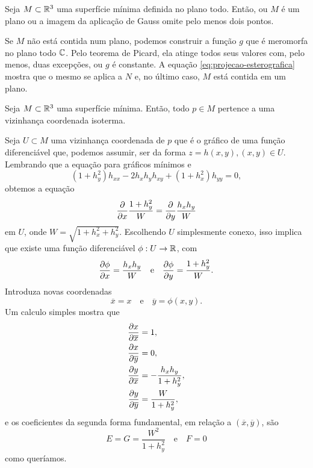 \begin{corolario}
	Seja $M \subset \mathbb{R}^3$ uma superfície mínima definida no plano todo. Então, ou $M$ é um plano ou a imagem da aplicação de Gauss omite pelo menos dois pontos.
\end{corolario}

\begin{demonstracao}
	Se $M$ não está contida num plano, podemos construir a função $g$ que é meromorfa no plano todo $\mathbb{C}$. Pelo teorema de Picard, ela atinge todos seus valores com, pelo menos, duas excepções, ou $g$ é constante. A equação \eqref{eq:projecao-esterografica} mostra que o mesmo se aplica a $N$ e, no último caso, $M$ está contida em um plano.
\end{demonstracao}

\begin{teorema}
	Seja $M \subset \mathbb{R}^3$ uma superfície mínima. Então, todo $p \in M$ pertence a uma vizinhança coordenada isoterma.
\end{teorema}

\begin{demonstracao}
	Seja $U \subset M$ uma vizinhança coordenada de $p$ que é o gráfico de uma função diferenciável que, podemos assumir, ser da forma $z = h(x,y), (x,y) \in U$.
	Lembrando que a equação para gráficos mínimos e
	\begin{equation*}
	(1 + h_y^2) h_{xx} - 2 h_x h_y h_{xy} + (1 + h_x^2) h_{yy} = 0,
	\end{equation*}
	obtemos a equação
	\begin{equation*}
	\frac{\partial}{\partial x} \frac{1 + h_y^2}{W} = \frac{\partial}{\partial y} \frac{h_x h_y}{W}
	\end{equation*}
	em $U$, onde $W = \sqrt{1 + h_x^2 + h_y^2}$. Escolhendo $U$ simplesmente conexo, isso implica que existe uma função diferenciável $\phi: U \rightarrow \mathbb{R}$, com
	\begin{equation*}
	\frac{\partial \phi}{\partial x} = \frac{h_x h_y}{W} \quad \text{e} \quad
	\frac{\partial \phi}{\partial y} = \frac{1 + h_y^2}{W}.
	\end{equation*}
	Introduza novas coordenadas
	\begin{equation*}
	\overline{x} = x \quad \text{e} \quad
	\overline{y} = \phi(x,y).
	\end{equation*}
	Um calculo simples mostra que
	\begin{align*}
	\frac{\partial x}{\partial \overline{x}} &= 1, \\
	\frac{\partial x}{\partial \overline{y}} &= 0, \\
	\frac{\partial y}{\partial \overline{x}} &= -\frac{h_x h_y}{1 + h_y^2}, \\
	\frac{\partial y}{\partial \overline{y}} &= \frac{W}{1 + h_y^2},
	\end{align*}
	e os coeficientes da segunda forma fundamental, em relação a $(\overline{x}, \overline{y})$, são
	\begin{equation*}
	E = G = \frac{W^2}{1 + h_y^2} \quad \text{e} \quad
	F = 0
	\end{equation*}
	como queríamos.
\end{demonstracao}

